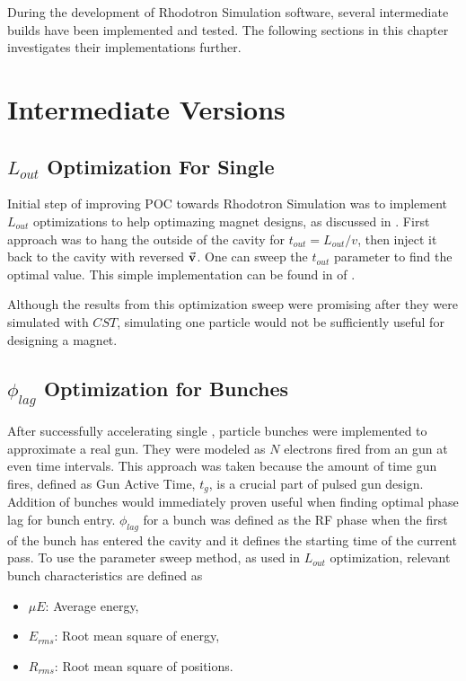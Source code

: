 \documentclass[a4paper,oneside,12pt]{report}
\numberwithin{equation}{chapter}
\begin{document}
During the development of Rhodotron Simulation software, several intermediate builds have been implemented and tested. The following sections in this chapter investigates their implementations further.



\section{Intermediate Versions}

\subsection{$L_{out}$ Optimization For Single \e} \label{sec:lout_sweep}
Initial step of improving POC towards Rhodotron Simulation was to implement $L_{out}$ optimizations to help optimazing magnet designs, as discussed in .
First approach was to hang the \e outside of the cavity for $t_{out} = L_{out}/v$, then inject it back to the cavity with reversed $\vec{\textbf{v}}$. One can sweep the $t_{out}$ parameter to find the optimal value.
This simple implementation can be found in  of .

Although the results from this optimization sweep were promising after they were simulated with $CST$, simulating one particle would not be sufficiently useful for designing a magnet.

\subsection{$\phi_{lag}$ Optimization for Bunches} \label{sec:philag_sweep}
After successfully accelerating single \e, particle bunches were implemented to approximate a real \e gun. 
They were modeled as $N$ electrons fired from an \e gun at even time intervals. This approach was taken because the amount of time gun fires, defined as Gun Active Time, $t_g$, is a crucial part of pulsed \e gun design.
\clearpage
Addition of bunches would immediately proven useful when finding optimal phase lag for bunch entry.
$\phi_{lag}$ for a bunch was defined as the RF phase when the first \e of the bunch has entered the cavity and it defines the starting time of the current pass.
To use the parameter sweep method, as used in $L_{out}$ optimization, relevant bunch characteristics are defined as
\vspace{-10pt}\begin{itemize}
    \item $\mu E$: Average energy,
    \item $E_{rms}$: Root mean square of energy,
    \item $R_{rms}$: Root mean square of \e positions.
\end{itemize}
\end{document}
